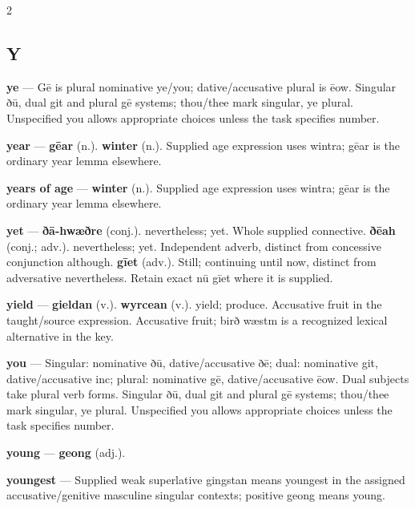 \begin{multicols}{2}
\subsection*{Y}
\textbf{ye} — Gē is plural nominative ye/you; dative/accusative plural is ēow. Singular ðū, dual git and plural gē systems; thou/thee mark singular, ye plural. Unspecified you allows appropriate choices unless the task specifies number.\par
\textbf{year} — \textbf{gēar} (n.).  \textbf{winter} (n.). Supplied age expression uses wintra; gēar is the ordinary year lemma elsewhere.\par
\textbf{years of age} — \textbf{winter} (n.). Supplied age expression uses wintra; gēar is the ordinary year lemma elsewhere.\par
\textbf{yet} — \textbf{ðā-hwæðre} (conj.). nevertheless; yet. Whole supplied connective. \textbf{ðēah} (conj.; adv.). nevertheless; yet. Independent adverb, distinct from concessive conjunction although. \textbf{gīet} (adv.). Still; continuing until now, distinct from adversative nevertheless. Retain exact nū gīet where it is supplied.\par
\textbf{yield} — \textbf{gieldan} (v.).  \textbf{wyrcean} (v.). yield; produce. Accusative fruit in the taught/source expression. Accusative fruit; birð wæstm is a recognized lexical alternative in the key.\par
\textbf{you} — Singular: nominative ðū, dative/accusative ðē; dual: nominative git, dative/accusative inc; plural: nominative gē, dative/accusative ēow. Dual subjects take plural verb forms. Singular ðū, dual git and plural gē systems; thou/thee mark singular, ye plural. Unspecified you allows appropriate choices unless the task specifies number.\par
\textbf{young} — \textbf{geong} (adj.).\par
\textbf{youngest} — Supplied weak superlative gingstan means youngest in the assigned accusative/genitive masculine singular contexts; positive geong means young.\par

\end{multicols}
